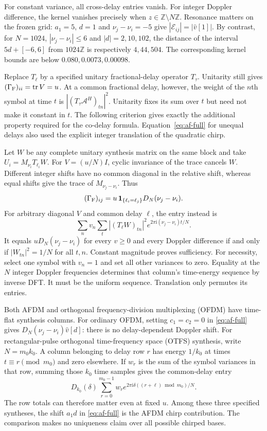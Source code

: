 For constant variance, all cross-delay entries vanish. For integer
Doppler difference, the kernel vanishes precisely when
$z\in\mathbb Z\setminus N\mathbb Z$. Resonance matters on the frozen grid:
$a_1=5$, $d=1$ and $\nu_j-\nu_i=-5$ give
$|\mathcal E_{ij}|=|\widehat v[1]|$. By contrast, for $N=1024$,
$|\nu_j-\nu_i|\le6$ and $|d|=2,10,102$, the distance of the interval
$5d+[-6,6]$ from $1024\mathbb Z$ is respectively $4,44,504$.
The corresponding kernel bounds are below $0.080,0.0073,0.00098$.

\begin{afdmremark}
Replace $T_\ell$ by a specified unitary fractional-delay operator $T_\tau$.
Unitarity still gives $(\Gamma_{\rm F})_{ii}=\operatorname{tr}V=u$.
At a common fractional delay, however, the weight of the $n$th symbol
at time $t$ is $|(T_\tau\mathcal A^H)_{tn}|^2$. Unitarity fixes its
sum over $t$ but need not make it constant in $t$. The following criterion
gives exactly the additional property required for the co-delay formula.
Equation~\eqref{eq:af-full} for unequal delays also used the explicit
integer translation of the quadratic chirp.
\end{afdmremark}

\begin{afdmremark}
Let $W$ be any complete unitary synthesis matrix on the same block and
take $U_i=M_{\nu_i}T_{\ell_i}W$. For $V=(u/N)I$, cyclic invariance of
the trace cancels $W$. Different integer shifts have no common diagonal
in the relative shift, whereas equal shifts give the trace of
$M_{\nu_j-\nu_i}$. Thus
\[
 (\Gamma_{\rm F})_{ij}
 =u\,\mathbf1_{\{\ell_i=\ell_j\}}D_N(\nu_j-\nu_i).
\]
For arbitrary diagonal $V$ and common delay $\ell$, the entry instead is
\[
 \sum_n v_n\sum_t |(T_\ell W)_{tn}|^2
             e^{2\pi\mathrm{i}(\nu_j-\nu_i)t/N}.
\]
It equals $uD_N(\nu_j-\nu_i)$ for every $v\ge0$ and every Doppler
difference if and only if $|W_{tn}|^2=1/N$ for all $t,n$.
Constant magnitude proves sufficiency. For necessity, select one
symbol with $v_n=1$ and set all other variances to zero. Equality at the
$N$ integer Doppler frequencies determines that column's time-energy
sequence by inverse DFT. It must be the uniform sequence. Translation
only permutes its entries.

Both AFDM and orthogonal frequency-division multiplexing (OFDM) have
time-flat synthesis columns. For ordinary OFDM, setting $c_1=c_2=0$
in \eqref{eq:af-full} gives $D_N(\nu_j-\nu_i)\widehat v[d]$:
there is no delay-dependent Doppler shift. For rectangular-pulse
orthogonal time-frequency space (OTFS) synthesis, write $N=m_0k_0$.
A column belonging to delay row $r$ has energy $1/k_0$ at times
$t\equiv r\pmod{m_0}$ and zero elsewhere. If $w_r$ is the sum of the
symbol variances in that row, summing those $k_0$ time samples gives
the common-delay entry
\[
 D_{k_0}(\delta)\sum_{r=0}^{m_0-1}
 w_r e^{2\pi\mathrm{i}\delta((r+\ell)\bmod m_0)/N}.
\]
The row totals can therefore matter even at fixed $u$. Among these three
specified syntheses, the shift $a_1d$ in \eqref{eq:af-full} is the
AFDM chirp contribution. The comparison makes no uniqueness claim over
all possible chirped bases.
\end{afdmremark}

